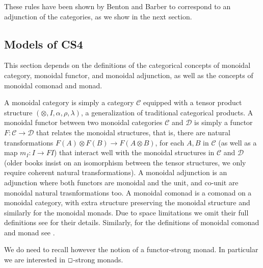 \documentclass{article}
\renewcommand{\Box}{\oblong}
\newcommand{\cat}[1]{\mathcal{#1}}
\begin{document}
These rules have been shown by Benton \cite{benton1995} and Barber to correspond to an adjunction of the categories, as we show in the next section.  

\subsection{Models of CS4}
\label{subsec:single_adjoint_model_of_cs4}

This section depends on the definitions of the
categorical concepts of monoidal category, monoidal functor, and
monoidal adjunction, as well as the concepts of monoidal comonad and monad. 

A monoidal category is simply a category $\cat{C}$  equipped with a tensor product structure $(\otimes, I, \alpha, \rho, \lambda)$, a generalization of traditional categorical products. A monoidal functor between two monoidal categories $\cat{C}$ and $\cat{D}$ is simply a functor $F\colon \cat{C} \to \cat{D}$ that relates the monoidal structures, that is, there are natural transformations  $F(A)\otimes F(B)\to F(A \otimes B)$, for each $A,B$ in $\cat{C}$ (as well as a map $m_{I}\colon I \to FI$) that interact well with the monoidal structures  in $\cat{C}$ and  $\cat{D}$ (older books insist on an isomorphism between the tensor structures, we only require coherent natural transformations). A monoidal adjunction is an adjunction  where both functors are monoidal and the unit, and co-unit are monoidal natural trasnformations too. A monoidal comonad is a comonad on a monoidal category, with extra structure preserving the monoidal structure and similarly for the monoidal monads.
Due to space limitations we omit their full
definitions see \cite{benton1995} for their details.
Similarly, for the definitions of monoidal comonad and monad see
\cite{CS4}.

We do need to recall however the notion of a functor-strong monad. In particular we are interested in $\Box$-strong monads.
\end{document}

